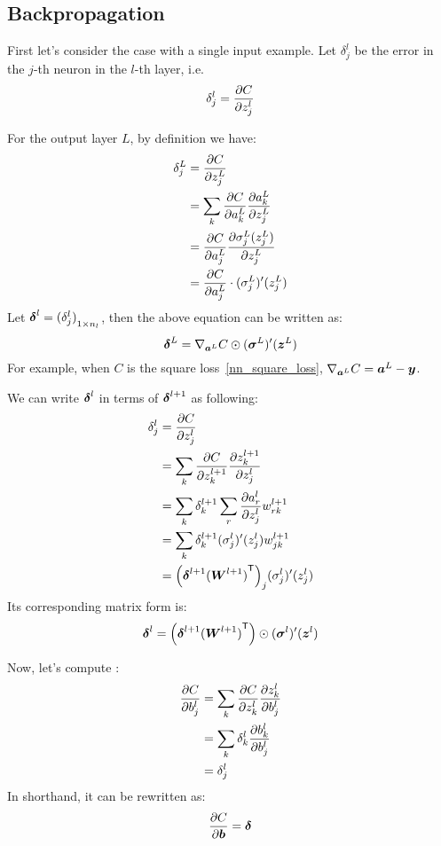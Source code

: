 \subsection{Backpropagation}
First let's consider the case with a single input example. Let $\delta^l_j$ be the error in the $j$-th neuron
in the $l$-th layer, i.e.
\begin{equation}\label{delta_l_j}
    \delta^l_j = \frac{\partial {C}}{\partial {z^l_j}}
\end{equation}

For the output layer $L$, by definition we have:
\begin{align*}
    \delta^L_j &= \frac{\partial {C}}{\partial {z^L_j}}\\
               &= \sum_k \frac{\partial {C}}{\partial {a^L_k}} \frac{\partial {a^L_k}}{\partial {z^L_j}}\\
               &= \frac{\partial {C}}{\partial {a^L_j}} \frac{\partial {\sigma^L_j(z^L_j)}}{\partial {z^L_j}}\\
               &= \frac{\partial {C}}{\partial {a^L_j}}\cdot (\sigma^L_j)'(z^L_j)
\end{align*}
Let $\boldsymbol{\delta}^l = {(\delta^l_j)}_{1 \times n_l}$, then the above equation can be written as:
\begin{equation}
    \boldsymbol{\delta}^L = \nabla_{\boldsymbol{a}^L}C \odot (\boldsymbol{\sigma}^L)'(\boldsymbol{z}^L)
\end{equation}
For example, when $C$ is the square loss~\eqref{nn_square_loss}, $\nabla_{\boldsymbol{a}^L}C = \boldsymbol{a}^L - \boldsymbol{y}$.
\par
We can write $\boldsymbol{\delta}^l$ in terms of $\boldsymbol{\delta}^{l+1}$ as following:
\begin{align*}
    \delta^l_j &= \frac{\partial {C}}{\partial {z^l_j}}\\
               &= \sum_k \frac{\partial {C}}{\partial {z^{l+1}_k}} \frac{\partial {z^{l+1}_k}}{\partial {z^l_j}}\\
               &= \sum_k \delta^{l+1}_k \sum_r \frac{\partial {a^l_r}}{\partial {z^l_j}} w^{l+1}_{rk}\\
               &= \sum_k \delta^{l+1}_k (\sigma^l_j)'(z^l_j) w^{l+1}_{jk}\\
               &= {\left(\boldsymbol{\delta}^{l+1} {(\boldsymbol{W}^{l+1})}^\mathsf{T}\right)}_{j} (\sigma^l_j)'(z^l_j)
\end{align*}
Its corresponding matrix form is:
\begin{equation}
    \boldsymbol{\delta}^l = \left(\boldsymbol{\delta}^{l+1} {(\boldsymbol{W}^{l+1})}^\mathsf{T}\right) \odot (\boldsymbol{\sigma}^l)'(\boldsymbol{z}^l)
\end{equation}

Now, let's compute :
\begin{align*}
    \frac{\partial {C}}{\partial {b^l_j}} &= \sum_k \frac{\partial {C}}{\partial {z^l_k}} \frac{\partial {z^l_k}}{\partial {b^l_j}}\\
                     &= \sum_k \delta^l_k \frac{\partial {b^l_k}}{\partial {b^l_j}}\\
                     &= \delta^l_j
\end{align*}
In shorthand, it can be rewritten as:
\begin{equation}
    \frac{\partial {C}}{\partial {\ensuremath{\boldsymbol{b}}}} = \boldsymbol{\delta}
\end{equation}

